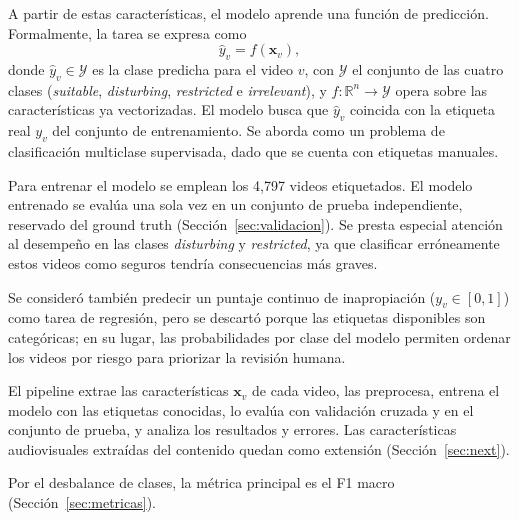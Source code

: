 \documentclass[conference]{IEEEtran}
\begin{document}
A partir de estas características, el modelo aprende una función de predicción. Formalmente, la tarea se expresa como
\begin{equation}
\hat{y}_v = f(\mathbf{x}_v),\label{eq:f}
\end{equation}
donde $\hat{y}_v\in\mathcal{Y}$ es la clase predicha para el video $v$, con $\mathcal{Y}$ el conjunto de las cuatro clases (\textit{suitable}, \textit{disturbing}, \textit{restricted} e \textit{irrelevant}), y $f\colon\mathbb{R}^{n}\to\mathcal{Y}$ opera sobre las características ya vectorizadas. El modelo busca que $\hat{y}_v$ coincida con la etiqueta real $y_v$ del conjunto de entrenamiento. Se aborda como un problema de clasificación multiclase supervisada, dado que se cuenta con etiquetas manuales.

Para entrenar el modelo se emplean los 4,797 videos etiquetados. El modelo entrenado se evalúa una sola vez en un conjunto de prueba independiente, reservado del ground truth (Sección~\ref{sec:validacion}). Se presta especial atención al desempeño en las clases \textit{disturbing} y \textit{restricted}, ya que clasificar erróneamente estos videos como seguros tendría consecuencias más graves.

Se consideró también predecir un puntaje continuo de inapropiación ($y_v \in [0,1]$) como tarea de regresión, pero se descartó porque las etiquetas disponibles son categóricas; en su lugar, las probabilidades por clase del modelo permiten ordenar los videos por riesgo para priorizar la revisión humana.

El pipeline extrae las características $\mathbf{x}_v$ de cada video, las preprocesa, entrena el modelo con las etiquetas conocidas, lo evalúa con validación cruzada y en el conjunto de prueba, y analiza los resultados y errores. Las características audiovisuales extraídas del contenido quedan como extensión (Sección~\ref{sec:next}).

Por el desbalance de clases, la métrica principal es el F1 macro (Sección~\ref{sec:metricas}).
\end{document}
